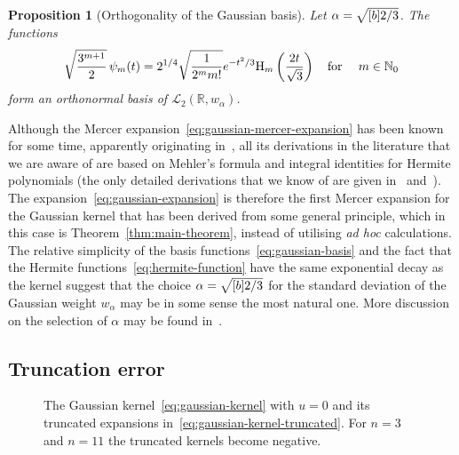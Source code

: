 \documentclass{article}
\newcommand{\tmcolor}[2]{{\color{#1}{#2}}}
\newcommand{\tmem}[1]{{\em #1\/}}
\newtheorem{proposition}{Proposition}
{\theorembodyfont{\rmfamily}\newtheorem{remark}{Remark}}
\newcommand{\R}{\mathbb{R}}
\newcommand{\N}{\mathbb{N}}
\newcommand{\rev}[1]{\tmcolor{black}{#1}}
\begin{document}
\begin{proposition}
  [Orthogonality of the Gaussian basis]\label{prop:gaussian-basis-L2}Let
  $\alpha = \sqrt{\smash{[} b] 2 / 3}$. The functions
  \[ \sqrt{\frac{3^{m + 1}}{2}}  \hspace{0.17em} \psi_m \rev{(t)} = 2^{1 / 4} 
     \sqrt{\frac{1}{2^m m!}} e^{- t^2 / 3} \mathrm{H}_m \left( \frac{2
     t}{\sqrt{3}} \right)  \quad \text{for } \quad m \in \N_0 \]
  form an orthonormal basis of $\mathscr{L}_2 (\R, w_{\alpha})$.
\end{proposition}

Although the Mercer expansion~\eqref{eq:gaussian-mercer-expansion} has been
known for some time, apparently originating in~{\cite[Section~4]{Zhu1998}},
all its derivations in the literature that we are aware of are based on
Mehler's formula and integral identities for Hermite polynomials (the only
detailed derivations that we know of are given
in~{\cite[Section~12.2.1]{FasshauerMcCourt2015}}
and~{\cite[Section~5.1]{Gnewuch2022}}). The
expansion~\eqref{eq:gaussian-expansion} is therefore the first Mercer
expansion for the Gaussian kernel that has been derived from some general
principle, which in this case is  Theorem~\ref{thm:main-theorem}, instead of
utilising {\tmem{ad hoc}} calculations. The relative simplicity of the basis
functions~\eqref{eq:gaussian-basis} and the fact that the Hermite
functions~\eqref{eq:hermite-function} have the same exponential decay as the
kernel suggest that the choice $\alpha = \sqrt{\smash{[} b] 2 / 3}$ for the
standard deviation of the Gaussian weight $w_{\alpha}$ may be in some sense
the most natural one. More discussion on the selection of $\alpha$ may be
found in~{\cite[Section~5.3]{FasshauerMcCourt2012}}.

\subsection{Truncation error}

\begin{figure}[h]
  \begin{center}
    \label{fig:gaussian-truncation}
  \end{center}
  \caption{The Gaussian kernel~\eqref{eq:gaussian-kernel} with $u = 0$ and its
  truncated expansions in~\eqref{eq:gaussian-kernel-truncated}. For $n = 3$
  and $n = 11$ the truncated kernels become negative.}
\end{figure}
\end{document}
